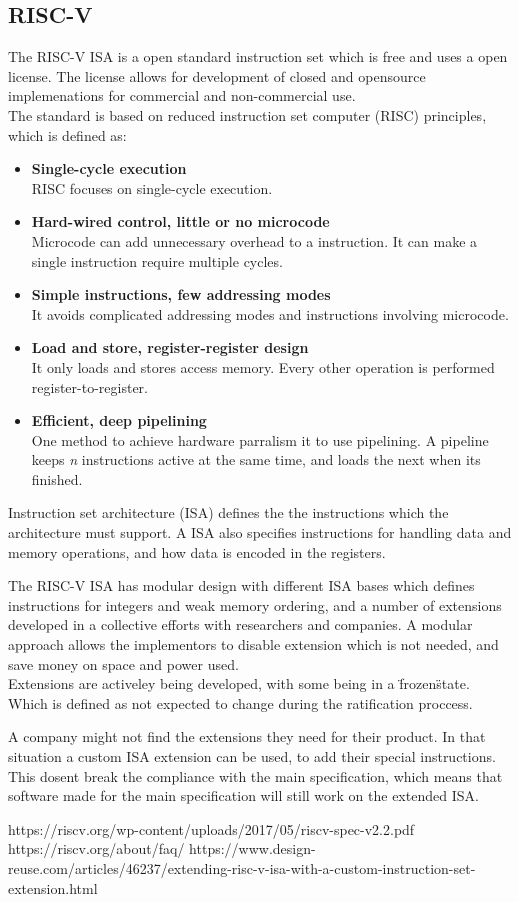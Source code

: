 \subsection{RISC-V}
The RISC-V ISA is a open standard instruction set which is free and uses a open license. The license allows for development of closed and opensource implemenations for commercial and non-commercial use.\\
The standard is based on reduced instruction set computer (RISC) principles, which is defined as:
\begin{itemize}
    \item \textbf{Single-cycle execution}\\RISC focuses on single-cycle execution.
    \item \textbf{Hard-wired control, little or no microcode}\\Microcode can add unnecessary overhead to a instruction. It can make a single instruction require multiple cycles.
    \item \textbf{Simple instructions, few addressing modes}\\It avoids complicated addressing modes and instructions involving microcode. 
    \item \textbf{Load and store, register-register design}\\It only loads and stores access memory. Every other operation is performed register-to-register.
    \item \textbf{Efficient, deep pipelining}\\One method to achieve hardware parralism it to use pipelining. A pipeline keeps \textit{n} instructions active at the same time, and loads the next when its finished.
\end{itemize}

Instruction set architecture (ISA) defines the the instructions which the architecture must support. A ISA also specifies instructions for handling data and memory operations, and how data is encoded in the registers.

The RISC-V ISA has modular design with different ISA bases which defines instructions for integers and weak memory ordering, and a number of extensions developed in a collective efforts with researchers and companies.
A modular approach allows the implementors to disable extension which is not needed, and save money on space and power used. \\
Extensions are activeley being developed, with some being in a \"frozen\" state. Which is defined as not expected to change during the ratification proccess.

A company might not find the extensions they need for their product. In that situation a custom ISA extension can be used, to add their special instructions. 
This dosent break the compliance with the main specification, which means that software made for the main specification will still work on the extended ISA.

https://riscv.org/wp-content/uploads/2017/05/riscv-spec-v2.2.pdf
https://riscv.org/about/faq/
https://www.design-reuse.com/articles/46237/extending-risc-v-isa-with-a-custom-instruction-set-extension.html